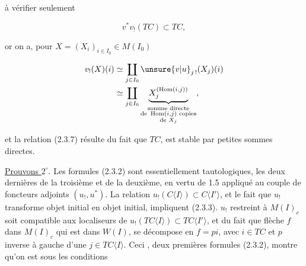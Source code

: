 
à vérifier seulement

\[
 v^{*}v_{!}(TC)\subset TC,\tag*{(2.3.7)}
\]

or on a, pour $X=(X_i)_{i\in I_0}\in M(I_0)$

\[
\begin{aligned}
 v_!(X)(i)&\simeq\coprod_{j\in I_0}\unsure{v|u}_{j\,!}(X_j)(i)\\
 &\simeq\coprod_{j\in I_0}\underbrace{X_j^{(\operatorname{Hom}(i,j))}}_{\substack{\text{somme directe}\\\text{de }\operatorname{Hom}(i,j)\text{ copies}\\\text{de }X_j}},
\end{aligned}
\]

et la relation (2.3.7) résulte du fait que
$TC$,  est stable par petites sommes directes.

\uline{Prouvons $2^\circ$}. Les formules (2.3.2) sont
essentiellement tautologiques, les deux dernières
 de la troisième et de la deuxième,
en vertu de 1.5 appliqué au couple de
foncteurs adjoints $(u_!,u^*)$. La relation
$u_!(C\langle I\rangle)\subset C\langle I'\rangle$, et le fait que
$u_!$ transforme objet initial en objet initial,
impliquent (2.3.3).  $u_!$ restreint à
$M(I)_c$ soit compatible aux localiseurs 
de $u_!(TC\langle I\rangle)\subset TC\langle I'\rangle$, et du
fait que  flèche $f$ dans $M(I)_c$ qui est
dans $W(I)$, se décompose en $f=pi$, avec
$i\in TC$ et $p$ inverse à gauche d'une $j\in TC\langle I\rangle$.
Ceci ,  deux premières formules
(2.3.2), montre qu'on est sous les conditions
